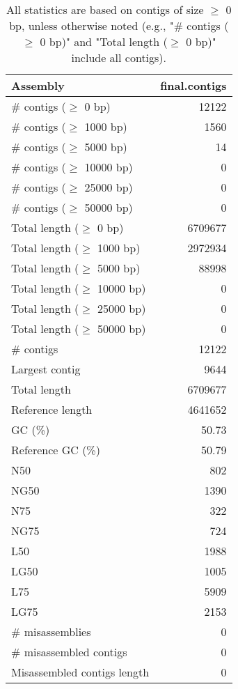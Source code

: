 \documentclass[12pt,a4paper]{article}
\begin{document}
\begin{table}[ht]
\begin{center}
\caption{All statistics are based on contigs of size $\geq$ 0 bp, unless otherwise noted (e.g., "\# contigs ($\geq$ 0 bp)" and "Total length ($\geq$ 0 bp)" include all contigs).}
\begin{tabular}{|l*{1}{|r}|}
\hline
Assembly & final.contigs \\ \hline
\# contigs ($\geq$ 0 bp) & 12122 \\ \hline
\# contigs ($\geq$ 1000 bp) & 1560 \\ \hline
\# contigs ($\geq$ 5000 bp) & 14 \\ \hline
\# contigs ($\geq$ 10000 bp) & 0 \\ \hline
\# contigs ($\geq$ 25000 bp) & 0 \\ \hline
\# contigs ($\geq$ 50000 bp) & 0 \\ \hline
Total length ($\geq$ 0 bp) & 6709677 \\ \hline
Total length ($\geq$ 1000 bp) & 2972934 \\ \hline
Total length ($\geq$ 5000 bp) & 88998 \\ \hline
Total length ($\geq$ 10000 bp) & 0 \\ \hline
Total length ($\geq$ 25000 bp) & 0 \\ \hline
Total length ($\geq$ 50000 bp) & 0 \\ \hline
\# contigs & 12122 \\ \hline
Largest contig & 9644 \\ \hline
Total length & 6709677 \\ \hline
Reference length & 4641652 \\ \hline
GC (\%) & 50.73 \\ \hline
Reference GC (\%) & 50.79 \\ \hline
N50 & 802 \\ \hline
NG50 & 1390 \\ \hline
N75 & 322 \\ \hline
NG75 & 724 \\ \hline
L50 & 1988 \\ \hline
LG50 & 1005 \\ \hline
L75 & 5909 \\ \hline
LG75 & 2153 \\ \hline
\# misassemblies & 0 \\ \hline
\# misassembled contigs & 0 \\ \hline
Misassembled contigs length & 0 \\ \hline

\end{tabular}
\end{center}
\end{table}
\end{document}

